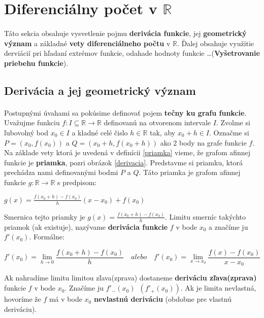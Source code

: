 \documentclass[12pt,a4paper]{article}
\begin{document}
\section{Diferenciálny počet v $\mathds{R}$}
\paragraph{}
Táto sekcia obsahuje vysvetlenie pojmu \textbf{derivácia funkcie}, jej \textbf{geometrický význam} a základné \textbf{vety diferenciálneho počtu} v $\mathds{R}$. Ďalej obsahuje využitie derviácií pri hľadaní extrémov funkcie, odahade hodnoty funkcie \dots (\textbf{Vyšetrovanie priebehu funkcie}).

\subsection{Derivácia a jej geometrický význam}
\paragraph{}

Postupnými úvahami sa pokúsime definovať pojem \textbf{tečny ku grafu funkcie}. Uvažujme funkciu $f: I \subseteq \mathds{R} \rightarrow \mathds{R}$ definovanú na otvorenom intervale $I$. Zvolme si ľubovolný bod $x_{0}\in I$ a kladné celé čislo $h \in \mathds{R}$ tak, aby $x_{0}+h\in I$. Označme si $P=(x_{0}, f(x_{0}))$ a $Q=(x_{0}+h, f(x_{0}+h))$ ako 2 body na grafe funkcie $f$. Na základe vety ktorá je uvedená v definícii \ref{priamka} vieme, že grafom afinnej funkcie je \textbf{priamka}, pozri obrázok \ref{derivacia}. Predstavme si priamku, ktorá prechádza nami definovanými bodmi $P$ a $Q$. Táto priamka je grafom afinnej funkcie $g:\mathds{R} \rightarrow \mathds{R}$ s predpisom:
\begin{center}
	$g(x)=\frac{f(x_{0}+h)-f(x_{0})}{h}(x-x_{0})+f(x_{0})$
\end{center}
Smernica tejto priamky je $g(x)=\frac{f(x_{0}+h)-f(x_{0})}{h}$. Limitu smerníc takýchto priamok (ak existuje), nazývame \textbf{derivácia funkcie} $f$ v bode $x_{0}$ a značíme ju $f'(x_{0})$. Formálne:
\vspace{-0.75cm}
\begin{center}
	$$f'(x_{0})= \lim_{h\rightarrow 0}\frac{f(x_{0}+h)-f(x_{0})}{h} \quad alebo \quad f'(x_{0})= \lim_{x\rightarrow x_{0}}\frac{f(x)-f(x_{0})}{x-x_{0}}$$
\end{center}
Ak nahradíme limitu limitou zľava(zprava) dostaneme \textbf{deriváciu zľava(zprava)} funkcie $f$ v bode $x_{0}$. Značíme ju $f'_{-}(x_{0})\enspace (f'_{+}(x_{0}))$. Ak je limita nevlastná, hovoríme že $f$ má v bode $x_{0}$ \textbf{nevlastnú deriváciu} (obdobne pre vlastnú deriváciu). 
\end{document}
